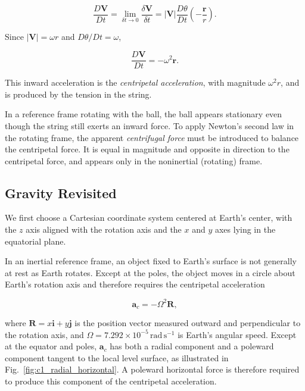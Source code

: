 \documentclass[10pt,twocolumn]{memoir}
\begin{document}
\begin{equation}
    \frac{D\mathbf{V}}{Dt} = \lim_{\delta t\rightarrow 0}\frac{\delta\mathbf{V}}{\delta t} = |\mathbf{V}|\frac{D\theta}{Dt}\left(-\frac{\mathbf{r}}{r}\right).
\end{equation}

Since $|\mathbf{V}|=\omega r$ and $D\theta/Dt=\omega$,

\begin{equation}
    \frac{D\mathbf{V}}{Dt} = -\omega^2\mathbf{r}.
\end{equation}

This inward acceleration is the \textit{centripetal acceleration}, with magnitude $\omega^2r$, and is produced by the tension in the string.

In a reference frame rotating with the ball, the ball appears stationary even though the string still exerts an inward force. To apply Newton's second law in the rotating frame, the apparent \textit{centrifugal force} must be introduced to balance the centripetal force. It is equal in magnitude and opposite in direction to the centripetal force, and appears only in the noninertial (rotating) frame.

\subsection{Gravity Revisited}

We first choose a Cartesian coordinate system centered at Earth’s center, with the $z$ axis aligned with the rotation axis and the $x$ and $y$ axes lying in the equatorial plane.

In an inertial reference frame, an object fixed to Earth's surface is not generally at rest as Earth rotates. Except at the poles, the object moves in a circle about Earth's rotation axis and therefore requires the centripetal acceleration

\begin{equation}
    \mathbf{a}_c=-\Omega^2\mathbf{R},
\end{equation}

where $\mathbf{R}=x\mathbf{i}+y\mathbf{j}$ is the position vector measured outward and perpendicular to the rotation axis, and $\Omega=7.292\times10^{-5}\,\mathrm{rad\,s^{-1}}$ is Earth's angular speed. Except at the equator and poles, $\mathbf{a}_c$ has both a radial component and a poleward component tangent to the local level surface, as illustrated in Fig.~\ref{fig:c1_radial_horizontal}. A poleward horizontal force is therefore required to produce this component of the centripetal acceleration.
\end{document}
